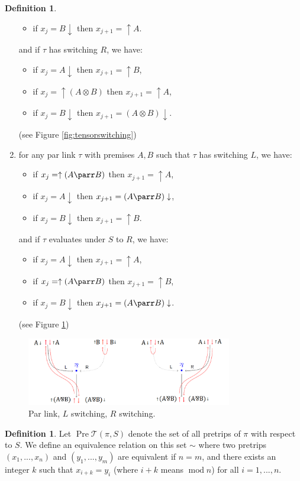 \documentclass[12pt]{article}
\theoremstyle{plain}
\theoremstyle{definition}
\newtheorem{defn}[thm]{Definition} %
\newcommand{\call}[1]{\mathcal{#1}}
\begin{document}
\begin{defn}
\begin{enumerate}
\begin{itemize}
				\item if $x_j = B \downarrow$ then $x_{j+1} = \uparrow A$.
			\end{itemize}
			and if $\tau$ has switching $R$, we have:
			\begin{itemize}
				\item if $x_j = A \downarrow$ then $x_{j+1} = \uparrow B$,
				\item if $x_j = \uparrow (A \otimes B)$ then $x_{j+1} = \uparrow A$,
				\item if $x_j = B \downarrow$ then $x_{j+1} = (A \otimes B) \downarrow$.
			\end{itemize}
			(see Figure \ref{fig:tensorswitching})
			\item\label{def:trip_right_par} for any par link $\tau$ with premises $A,B$ such that $\tau$ has switching $L$, we have:
			\begin{itemize}
				\item if $x_j = \uparrow (A \parr B)$ then $x_{j+1} = \uparrow A$,
				\item if $x_j = A\downarrow$ then $x_{j+1} = (A \parr B)\downarrow$,
				\item if $x_j = B\downarrow$ then $x_{j+1} = \uparrow B$.
			\end{itemize}
			and if $\tau$ evaluates under $S$ to $R$, we have:
			\begin{itemize}
				\item if $x_j = A\downarrow$ then $x_{j+1} = \uparrow A$,
				\item if $x_j = \uparrow (A\parr B)$ then $x_{j+1} = \uparrow B$,
				\item if $x_j = B\downarrow$ then $x_{j+1} = (A\parr B)\downarrow$.
			\end{itemize}
			(see Figure \ref{fig:parrswitching})
		\end{enumerate}
		\begin{figure}[h]
			\centering
			\includegraphics[width = 0.8\textwidth]{ParrSwitching.png}
			\caption{Par link, $L$ switching, $R$ switching.}
			\label{fig:parrswitching}
		\end{figure}
		\begin{defn}
			Let $\operatorname{Pre}\call{T}(\pi,S)$ denote the set of all pretrips of $\pi$ with respect to $S$. We define an equivalence relation on this set $\sim$ where two pretrips $(x_1,...,x_n)$ and $(y_1,...,y_m)$ are equivalent if $n = m$, and there exists an integer $k$ such that $x_{i + k} = y_i$ (where $i + k$ means $\operatorname{mod} n$) for all $i = 1,...,n$.
			

\end{defn}
\end{defn}
\end{document}
